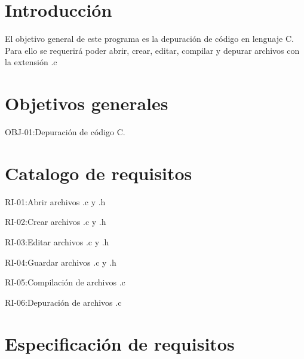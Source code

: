 
\section{Introducción}

El objetivo general de este programa es la depuración de código en lenguaje C. Para ello se requerirá poder abrir, crear, editar, compilar y depurar archivos con la extensión .c

\section{Objetivos generales}

\item OBJ-01:Depuración de código C.

\section{Catalogo de requisitos}

\item RI-01:Abrir archivos .c y .h
\item RI-02:Crear archivos .c y .h
\item RI-03:Editar archivos .c y .h
\item RI-04:Guardar archivos .c y .h
\item RI-05:Compilación de archivos .c
\item RI-06:Depuración de archivos .c

\section{Especificación de requisitos}


